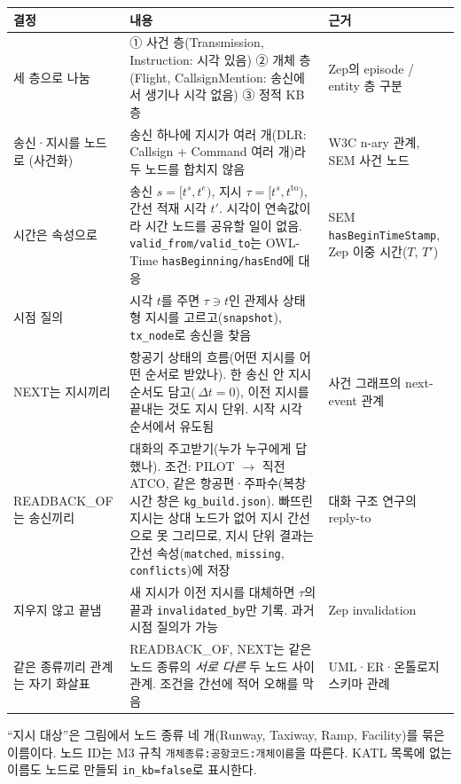 \documentclass[10pt,a4paper]{article}
\begin{document}
\begin{center}\footnotesize
\begin{tabularx}{\textwidth}{@{}>{\raggedright\arraybackslash}p{3.0cm}>{\raggedright\arraybackslash}X>{\raggedright\arraybackslash}p{3.6cm}@{}}
\toprule
결정 & 내용 & 근거\\\midrule
세 층으로 나눔 & ① 사건 층(Transmission, Instruction: 시각 있음) ② 개체 층(Flight, CallsignMention: 송신에서 생기나 시각 없음) ③ 정적 KB 층 & Zep의 episode / entity 층 구분\\
송신·지시를 노드로 (사건화) & 송신 하나에 지시가 여러 개(DLR: Callsign + Command 여러 개)라 두 노드를 합치지 않음 & W3C n-ary 관계, SEM 사건 노드\\
시간은 속성으로 & 송신 $s=[t^s,t^e)$, 지시 $\tau=[t^s,t^{\mathrm{to}})$, 간선 적재 시각 $t'$. 시각이 연속값이라 시간 노드를 공유할 일이 없음. \texttt{valid\_from/valid\_to}는 OWL-Time \texttt{hasBeginning/hasEnd}에 대응 & SEM \texttt{hasBeginTimeStamp}, Zep 이중 시간($T$, $T'$)\\
시점 질의 & 시각 $t$를 주면 $\tau\ni t$인 관제사 상태형 지시를 고르고(\texttt{snapshot}), \texttt{tx\_node}로 송신을 찾음 & \\
NEXT는 지시끼리 & 항공기 상태의 흐름(어떤 지시를 어떤 순서로 받았나). 한 송신 안 지시 순서도 담고(\,$\Delta t=0$), 이전 지시를 끝내는 것도 지시 단위. 시작 시각 순서에서 유도됨 & 사건 그래프의 next-event 관계\\
READBACK\_OF는 송신끼리 & 대화의 주고받기(누가 누구에게 답했나). 조건: PILOT $\to$ 직전 ATCO, 같은 항공편·주파수(복창 시간 창은 \texttt{kg\_build.json}). 빠뜨린 지시는 상대 노드가 없어 지시 간선으로 못 그리므로, 지시 단위 결과는 간선 속성(\texttt{matched}, \texttt{missing}, \texttt{conflicts})에 저장 & 대화 구조 연구의 reply-to\\
지우지 않고 끝냄 & 새 지시가 이전 지시를 대체하면 $\tau$의 끝과 \texttt{invalidated\_by}만 기록. 과거 시점 질의가 가능 & Zep invalidation\\
같은 종류끼리 관계는 자기 화살표 & READBACK\_OF, NEXT는 같은 노드 종류의 \emph{서로 다른} 두 노드 사이 관계. 조건을 간선에 적어 오해를 막음 & UML·ER·온톨로지 스키마 관례\\
\bottomrule
\end{tabularx}
\end{center}
{\footnotesize ``지시 대상''은 그림에서 노드 종류 네 개(Runway, Taxiway, Ramp, Facility)를 묶은 이름이다. 노드 ID는 M3 규칙 \texttt{개체종류:공항코드:개체이름}을 따른다. KATL 목록에 없는 이름도 노드로 만들되 \texttt{in\_kb=false}로 표시한다.}
\end{document}
